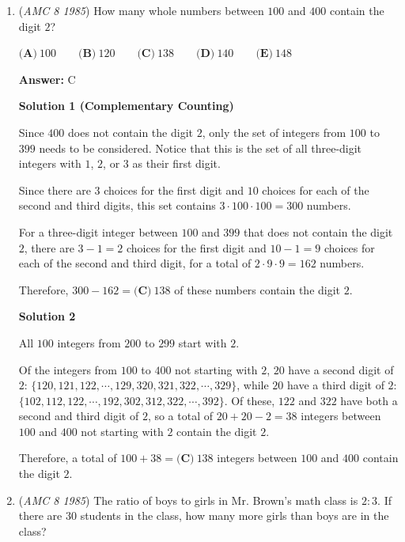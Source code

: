 \begin{enumerate}
 


	\item (\textit{AMC 8 1985}) How many whole numbers between $100$ and $400$ contain the digit $2$?


 $\textbf{(A)}\ 100 \qquad \textbf{(B)}\ 120 \qquad \textbf{(C)}\ 138 \qquad \textbf{(D)}\ 140 \qquad \textbf{(E)}\ 148$

 \textbf{Answer: }C



\textbf{Solution 1 (Complementary Counting)}

Since $400$ does not contain the digit $2$, only the set of integers from $100$ to $399$ needs to be considered.  Notice that this is the set of all three-digit integers with $1$, $2$, or $3$ as their first digit.  

 Since there are $3$ choices for the first digit and $10$ choices for each of the second and third digits, this set contains $3 \cdot 100 \cdot 100 = 300$ numbers.

 For a three-digit integer between $100$ and $399$ that does not contain the digit $2$, there are $3-1=2$ choices for the first digit and $10-1=9$ choices for each of the second and third digit, for a total of $2 \cdot 9 \cdot 9 = 162$ numbers.

 Therefore, $300 - 162 = \boxed{\textbf{(C)}\ 138}$ of these numbers contain the digit $2$.

 



\textbf{Solution 2}

All $100$ integers from $200$ to $299$ start with $2$.  

 Of the integers from $100$ to $400$ not starting with $2$, $20$ have a second digit of $2$: $\{120, 121, 122, \cdots, 129, 320, 321, 322, \cdots, 329\}$, while $20$ have a third digit of $2$: $\{102, 112, 122, \cdots, 192, 302, 312, 322, \cdots, 392\}$. Of these, $122$ and $322$ have both a second and third digit of $2$, so a total of $20 + 20 - 2 = 38$ integers between $100$ and $400$ not starting with $2$ contain the digit $2$.

 Therefore, a total of $100 + 38 = \boxed{\textbf{(C)}\ 138}$ integers between $100$ and $400$ contain the digit $2$.

 


	\item (\textit{AMC 8 1985}) The ratio of boys to girls in Mr. Brown's math class is $2:3$.  If there are $30$ students in the class, how many more girls than boys are in the class?



\end{enumerate}
